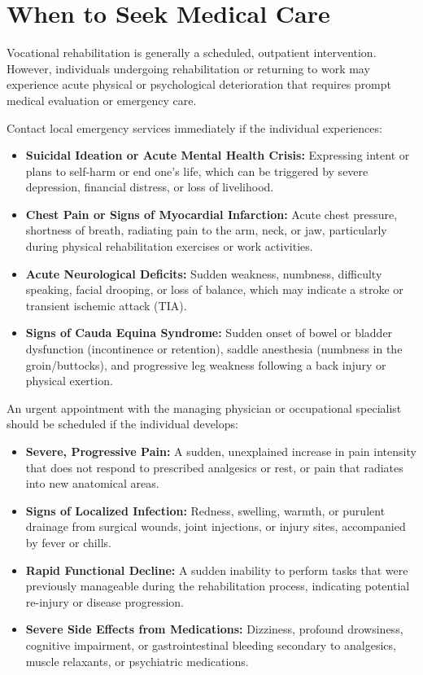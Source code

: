 \section*{When to Seek Medical Care}
Vocational rehabilitation is generally a scheduled, outpatient intervention. However, individuals undergoing rehabilitation or returning to work may experience acute physical or psychological deterioration that requires prompt medical evaluation or emergency care.

Contact local emergency services immediately if the individual experiences:
\begin{itemize}
    \item \textbf{Suicidal Ideation or Acute Mental Health Crisis:} Expressing intent or plans to self-harm or end one's life, which can be triggered by severe depression, financial distress, or loss of livelihood.
    \item \textbf{Chest Pain or Signs of Myocardial Infarction:} Acute chest pressure, shortness of breath, radiating pain to the arm, neck, or jaw, particularly during physical rehabilitation exercises or work activities.
    \item \textbf{Acute Neurological Deficits:} Sudden weakness, numbness, difficulty speaking, facial drooping, or loss of balance, which may indicate a stroke or transient ischemic attack (TIA).
    \item \textbf{Signs of Cauda Equina Syndrome:} Sudden onset of bowel or bladder dysfunction (incontinence or retention), saddle anesthesia (numbness in the groin/buttocks), and progressive leg weakness following a back injury or physical exertion.
\end{itemize}

An urgent appointment with the managing physician or occupational specialist should be scheduled if the individual develops:
\begin{itemize}
    \item \textbf{Severe, Progressive Pain:} A sudden, unexplained increase in pain intensity that does not respond to prescribed analgesics or rest, or pain that radiates into new anatomical areas.
    \item \textbf{Signs of Localized Infection:} Redness, swelling, warmth, or purulent drainage from surgical wounds, joint injections, or injury sites, accompanied by fever or chills.
    \item \textbf{Rapid Functional Decline:} A sudden inability to perform tasks that were previously manageable during the rehabilitation process, indicating potential re-injury or disease progression.
    \item \textbf{Severe Side Effects from Medications:} Dizziness, profound drowsiness, cognitive impairment, or gastrointestinal bleeding secondary to analgesics, muscle relaxants, or psychiatric medications.
\end{itemize}

